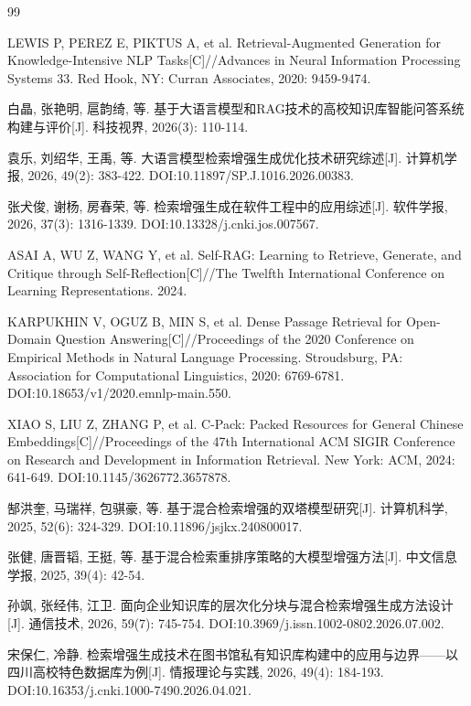 \clearpage
\renewcommand{\bibname}{参考文献}
\begin{thebibliography}{99}
\setlength{\itemsep}{2pt}
\setlength{\parskip}{0pt}

LEWIS P, PEREZ E, PIKTUS A, et al. Retrieval-Augmented Generation for Knowledge-Intensive NLP Tasks[C]//Advances in Neural Information Processing Systems 33. Red Hook, NY: Curran Associates, 2020: 9459-9474.

白晶, 张艳明, 扈韵绮, 等. 基于大语言模型和RAG技术的高校知识库智能问答系统构建与评价[J]. 科技视界, 2026(3): 110-114.

袁乐, 刘绍华, 王禹, 等. 大语言模型检索增强生成优化技术研究综述[J]. 计算机学报, 2026, 49(2): 383-422. DOI:10.11897/SP.J.1016.2026.00383.

张犬俊, 谢杨, 房春荣, 等. 检索增强生成在软件工程中的应用综述[J]. 软件学报, 2026, 37(3): 1316-1339. DOI:10.13328/j.cnki.jos.007567.

ASAI A, WU Z, WANG Y, et al. Self-RAG: Learning to Retrieve, Generate, and Critique through Self-Reflection[C]//The Twelfth International Conference on Learning Representations. 2024.

KARPUKHIN V, OGUZ B, MIN S, et al. Dense Passage Retrieval for Open-Domain Question Answering[C]//Proceedings of the 2020 Conference on Empirical Methods in Natural Language Processing. Stroudsburg, PA: Association for Computational Linguistics, 2020: 6769-6781. DOI:10.18653/v1/2020.emnlp-main.550.

XIAO S, LIU Z, ZHANG P, et al. C-Pack: Packed Resources for General Chinese Embeddings[C]//Proceedings of the 47th International ACM SIGIR Conference on Research and Development in Information Retrieval. New York: ACM, 2024: 641-649. DOI:10.1145/3626772.3657878.

郜洪奎, 马瑞祥, 包骐豪, 等. 基于混合检索增强的双塔模型研究[J]. 计算机科学, 2025, 52(6): 324-329. DOI:10.11896/jsjkx.240800017.

张健, 唐晋韬, 王挺, 等. 基于混合检索重排序策略的大模型增强方法[J]. 中文信息学报, 2025, 39(4): 42-54.

孙飒, 张经伟, 江卫. 面向企业知识库的层次化分块与混合检索增强生成方法设计[J]. 通信技术, 2026, 59(7): 745-754. DOI:10.3969/j.issn.1002-0802.2026.07.002.

宋保仁, 冷静. 检索增强生成技术在图书馆私有知识库构建中的应用与边界——以四川高校特色数据库为例[J]. 情报理论与实践, 2026, 49(4): 184-193. DOI:10.16353/j.cnki.1000-7490.2026.04.021.


\end{thebibliography}
